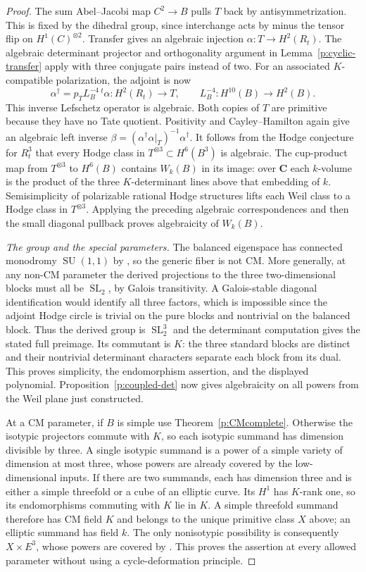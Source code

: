 \documentclass[10pt,reqno]{article}
\theoremstyle{emphasizedplain}
\theoremstyle{emphasizeddefinition}
\theoremstyle{emphasizeddefinition}
\DeclareMathOperator{\SL}{SL}
\DeclareMathOperator{\SU}{SU}
\newcommand{\C}{\mathbf C}
\begin{document}
\begin{proof}
The sum Abel--Jacobi map $C^2\to B$ pulls $T$ back by
antisymmetrization. This is fixed by the dihedral group, since
interchange acts by minus the tensor flip on $H^1(C)^{\otimes2}$.
Transfer gives an algebraic injection $\alpha:T\to H^2(R_t)$.
The algebraic determinant projector and orthogonality argument
in Lemma~\ref{p:cyclic-transfer} apply with three conjugate pairs
instead of two. For an associated $K$-compatible polarization,
the adjoint is now
\[
 \alpha^\dagger=p_T L_B^{-4}\,{}^t\!\alpha:
 H^2(R_t)\longrightarrow T,
 \qquad L_B^{-4}:H^{10}(B)\longrightarrow H^2(B).
\]
This inverse Lefschetz operator is algebraic. Both copies of $T$
are primitive because they have no Tate quotient. Positivity
and Cayley--Hamilton again give an algebraic left inverse
$\beta=(\alpha^\dagger\alpha|_T)^{-1}\alpha^\dagger$.
It follows from the Hodge conjecture for $R_t^3$ that every Hodge
class in $T^{\otimes3}\subset H^6(B^3)$ is algebraic.
The cup-product map from $T^{\otimes3}$ to $H^6(B)$ contains
$W_k(B)$ in its image: over $\C$ each $k$-volume is the product
of the three $K$-determinant lines above that embedding of $k$.
Semisimplicity of polarizable rational Hodge structures lifts
each Weil class to a Hodge class in $T^{\otimes3}$. Applying
the preceding algebraic correspondences and then the small
diagonal pullback proves algebraicity of $W_k(B)$.

\emph{The group and the special parameters.}
The balanced eigenspace has connected monodromy $\SU(1,1)$ by
\cite[Proposition 4.7(i)]{MoonenCyclic}, so the generic fiber is
not CM. More generally, at any non-CM parameter the derived
projections to the three two-dimensional blocks must all be
$\SL_2$, by Galois transitivity. A Galois-stable diagonal
identification would identify all three factors, which is
impossible since the adjoint Hodge circle is trivial on the pure
blocks and nontrivial on the balanced block. Thus the derived
group is $\SL_2^3$ and the determinant computation gives the
stated full preimage. Its commutant is $K$: the three standard
blocks are distinct and their nontrivial determinant characters
separate each block from its dual. This proves simplicity,
the endomorphism assertion, and the displayed polynomial.
Proposition~\ref{p:coupled-det} now gives algebraicity on all
powers from the Weil plane just constructed.

At a CM parameter, if $B$ is simple use Theorem~\ref{p:CMcomplete}.
Otherwise the isotypic projectors commute with $K$, so each
isotypic summand has dimension divisible by three. A single
isotypic summand is a power of a simple variety of dimension at
most three, whose powers are already covered by the low-dimensional
inputs. If there are two summands, each has dimension three and
is either a simple threefold or a cube of an elliptic curve.
Its $H^1$ has $K$-rank one, so its endomorphisms commuting with
$K$ lie in $K$. A simple threefold summand therefore has CM
field $K$ and belongs to the unique primitive class $X$ above;
an elliptic summand has field $k$. The only nonisotypic possibility
is consequently $X\times E^3$, whose powers are covered by
\cite[Corollary 1.11]{MilneTateStandard}. This proves the assertion
at every allowed parameter without using a cycle-deformation principle.


\end{proof}
\end{document}
